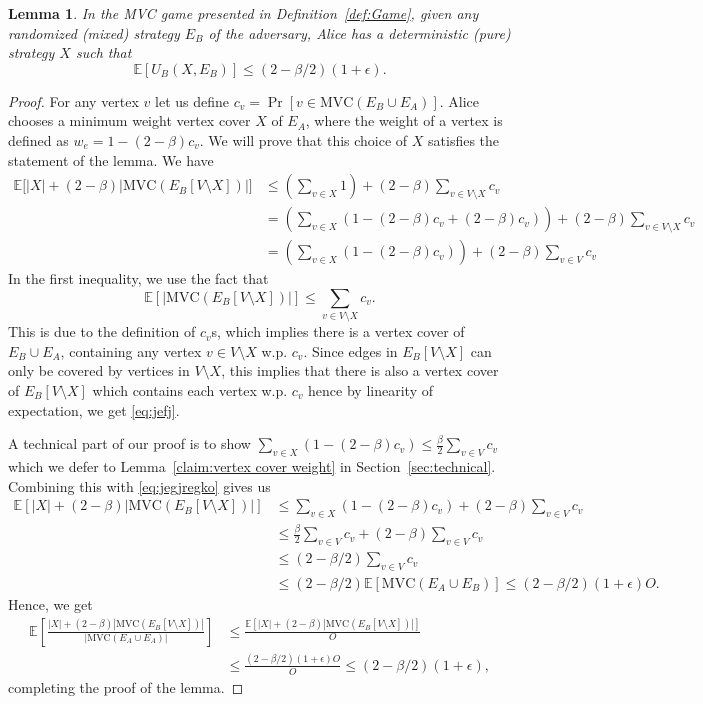 \documentclass[11pt]{article}
\newtheorem{lemma}[theorem]{Lemma}
\newcommand{\E}[0]{\ensuremath{\mathbb{E}}}
\newcommand{\MVC}{\text{MVC}}
\begin{document}
\begin{lemma}\label{lemma:pure}
    In the MVC game presented in Definition~\ref{def:Game}, given any
    randomized (mixed) strategy $E_B$ of the adversary, Alice has a
    deterministic (pure) strategy $X$ such that \[
    \E[U_B(X, E_B)]\leq
    (2-\beta/2)(1+\epsilon).\]
\end{lemma}
\begin{proof}
For any vertex $v$ let us define $c_v=\Pr[v\in \MVC(E_B\cup E_A)]$.   Alice chooses a minimum weight vertex cover $X$ of $E_A$, where the weight of a vertex is defined as $w_e= 1-(2-\beta)c_v$. We will prove that this choice of $X$ satisfies the statement of the lemma. We have 
\begin{align}
 \nonumber  \E\big[|X|+ (2-\beta)\big|\MVC(E_B[V \setminus X])\big|\big] & \leq \left( \sum_{v\in X} 1 \right)+   (2-\beta)\sum_{v\in V \setminus X} c_v  \\  \nonumber &= \left (\sum_{v\in X} (1- (2-\beta) c_v +  (2-\beta) c_v) \right) + (2-\beta)\sum_{v\in V \setminus X} c_v \\& = \left ( \sum_{v\in X} (1- (2-\beta) c_v)  \right )+ (2-\beta) \sum_{v\in V} c_v \label{eq:jegjregko}
\end{align}
In the first inequality, we use the fact that 
\begin{equation}\label{eq:jefj}
    \E[|\MVC(E_B[V \setminus X])|] \leq \sum_{v\in V \setminus X} c_v.
\end{equation} 
This is due to the definition of $c_v$s, which implies there is a vertex cover of $E_B\cup E_A$, containing any vertex $v\in V \setminus X$ w.p. $c_v$. Since edges in  $E_B[V \setminus X]$ can only be covered by vertices in $V \setminus X$, this implies that there is also a vertex cover of $E_B[V \setminus X]$ which contains each vertex w.p. $c_v$ hence by  linearity of expectation, we get \eqref{eq:jefj}.

 A technical part of our proof is to show $\sum_{v\in X} (1-
(2-\beta) c_v)\leq \frac{\beta}{2}\sum_{v\in V} c_v$ which we defer to
Lemma~\ref{claim:vertex cover weight} in
Section~\ref{sec:technical}. Combining this with \eqref{eq:jegjregko}
gives us
\begin{align*}
   \E[|X|+ (2-\beta)|\MVC(E_B[V \setminus X])|] &\leq   \sum_{v\in X} (1- (2-\beta) c_v) + (2-\beta) \sum_{v\in V} c_v \\ &\leq \frac{\beta}{2}\sum_{v\in V} c_v + (2-\beta) \sum_{v\in V} c_v\\ &\leq (2-\beta/2) \sum_{v\in V} c_v \\&\leq  (2-\beta/2) \E[\MVC(E_A \cup E_B)] \leq (2-\beta/2)(1+\epsilon)O.
\end{align*}
Hence, we get
\vspace{2 mm}
\begin{align*}
    \E\left[\frac{|X|+ (2-\beta)|\MVC(E_B[V \setminus X])|}{|\MVC(E_A \cup E_A)|}\right] &\leq \frac{\E\left[|X|+ (2-\beta)|\MVC(E_B[V \setminus X])|\right]}{O} \\&\leq 
    \frac{(2-\beta/2)(1+\epsilon)O}{O}\leq (2-\beta/2)(1+\epsilon),
\end{align*}
completing the proof of the lemma.
\end{proof}
\end{document}
